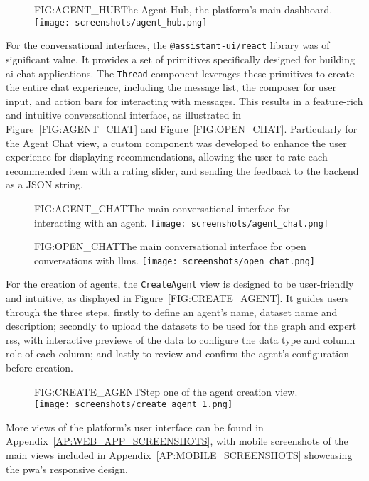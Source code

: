 \begin{figure}[Agent Hub]{FIG:AGENT_HUB}{The Agent Hub, the platform's main dashboard.}
    \texttt{[image: screenshots/agent\_hub.png]}
\end{figure}

For the conversational interfaces, the \texttt{@assistant-ui/react} library was of significant value. It provides a set of primitives specifically designed for building \acs{ai} chat applications. The \texttt{Thread} component leverages these primitives to create the entire chat experience, including the message list, the composer for user input, and action bars for interacting with messages. This results in a feature-rich and intuitive conversational interface, as illustrated in Figure~\ref{FIG:AGENT_CHAT} and Figure~\ref{FIG:OPEN_CHAT}. Particularly for the Agent Chat view, a custom component was developed to enhance the user experience for displaying recommendations, allowing the user to rate each recommended item with a rating slider, and sending the feedback to the backend as a JSON string.

\begin{figure}[Agent Chat]{FIG:AGENT_CHAT}{The main conversational interface for interacting with an agent.}
    \texttt{[image: screenshots/agent\_chat.png]}
\end{figure}

\begin{figure}[Open Chat]{FIG:OPEN_CHAT}{The main conversational interface for open conversations with \acsp{llm}.}
    \texttt{[image: screenshots/open\_chat.png]}
\end{figure}

For the creation of agents, the \texttt{CreateAgent} view is designed to be user-friendly and intuitive, as displayed in Figure~\ref{FIG:CREATE_AGENT}. It guides users through the three steps, firstly to define an agent's name, dataset name and description; secondly to upload the datasets to be used for the graph and expert \aclp{rs}, with interactive previews of the data to configure the data type and column role of each column; and lastly to review and confirm the agent's configuration before creation.

\begin{figure}[Create Agent]{FIG:CREATE_AGENT}{Step one of the agent creation view.}
    \texttt{[image: screenshots/create\_agent\_1.png]}
\end{figure}

More views of the platform's user interface can be found in Appendix~\ref{AP:WEB_APP_SCREENSHOTS}, with mobile screenshots of the main views included in Appendix~\ref{AP:MOBILE_SCREENSHOTS} showcasing the \ac{pwa}'s responsive design.